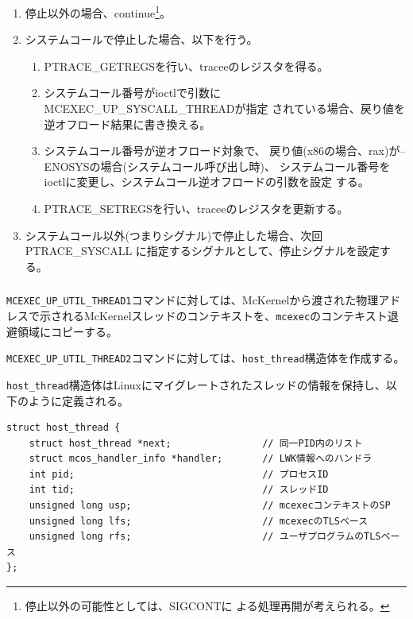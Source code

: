 \documentclass[twoside,11pt,fleqn]{book}
\begin{document}
\begin{enumerate}
\begin{enumerate}
\begin{enumerate}
\item 停止以外の場合、continue\footnote{停止以外の可能性としては、SIGCONTに
よる処理再開が考えられる。}。
\item システムコールで停止した場合、以下を行う。
\begin{enumerate}
\item PTRACE\_GETREGSを行い、traceeのレジスタを得る。
\item システムコール番号がioctlで引数にMCEXEC\_UP\_SYSCALL\_THREADが指定
されている場合、戻り値を逆オフロード結果に書き換える。
\item システムコール番号が逆オフロード対象で、
戻り値(x86の場合、rax)が--ENOSYSの場合(システムコール呼び出し時)、
システムコール番号をioctlに変更し、システムコール逆オフロードの引数を設定
する。
\item PTRACE\_SETREGSを行い、traceeのレジスタを更新する。
\end{enumerate}
\item システムコール以外(つまりシグナル)で停止した場合、次回PTRACE\_SYSCALL
に指定するシグナルとして、停止シグナルを設定する。
\end{enumerate}
\end{enumerate}

\end{enumerate}


\subsubsection{}

\texttt{MCEXEC\_UP\_UTIL\_THREAD1}コマンドに対しては、McKernelから渡された物理アドレスで示されるMcKernelスレッドのコンテキストを、\texttt{mcexec}のコンテキスト退避領域にコピーする。

\texttt{MCEXEC\_UP\_UTIL\_THREAD2}コマンドに対しては、\texttt{host\_thread}構造体を作成する。


\texttt{host\_thread}構造体はLinuxにマイグレートされたスレッドの情報を保持し、以下のように定義される。
\small
\begin{verbatim}
struct host_thread {
    struct host_thread *next;                // 同一PID内のリスト
    struct mcos_handler_info *handler;       // LWK情報へのハンドラ
    int pid;                                 // プロセスID
    int tid;                                 // スレッドID
    unsigned long usp;                       // mcexecコンテキストのSP
    unsigned long lfs;                       // mcexecのTLSベース
    unsigned long rfs;                       // ユーザプログラムのTLSベース
};
\end{verbatim}
\normalsize
\end{document}

